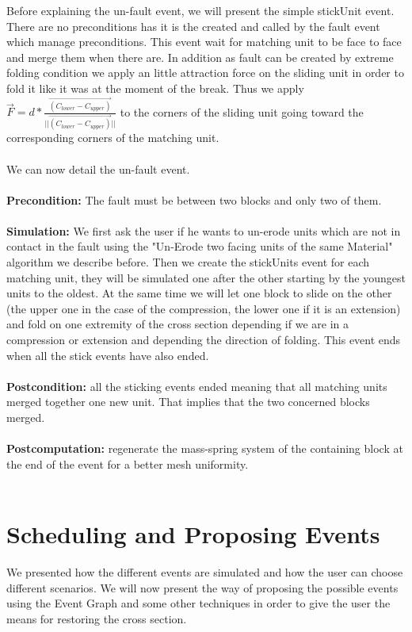 \documentclass[12pt, a4paper]{report} %
\begin{document}
Before explaining the un-fault event, we will present the simple stickUnit event. There are no preconditions has it is the created and called by the fault event which manage preconditions. This event wait for matching unit to be face to face and merge them when there are. In addition as fault can be created by extreme folding condition we apply an little attraction force on the sliding unit in order to fold it like it was at the moment of the break. Thus we apply $\overrightarrow{F} = d*\frac{\overrightarrow{(C_{lower} - C_{upper})} }{||\overrightarrow{(C_{lower} - C_{upper})}||}$ to the corners of the sliding unit going toward the corresponding corners of the matching unit.\\\\
We can now detail the un-fault event.\\\\
\textbf{Precondition:} The fault must be between two blocks and only two of them.\\\\
\textbf{Simulation:} We first ask the user if he wants to un-erode units which are not in contact in the fault using the "Un-Erode two facing units of the same Material" algorithm we describe before. Then we create the stickUnits event for each matching unit, they will be simulated one after the other starting by the youngest units to the oldest. At the same time we will let one block to slide on the other (the upper one in the case of the compression, the lower one if it is an extension) and fold on one extremity of the cross section depending if we are in a compression or extension and depending the direction of folding. This event ends when all the stick events have also ended.\\\\
\textbf{Postcondition:} all the sticking events ended meaning that all matching units merged together one new unit. That implies that the two concerned blocks merged.\\\\
\textbf{Postcomputation:} regenerate the mass-spring system of the containing block at the end of the event for a better mesh uniformity.\\\\ 
	
\chapter{Scheduling and Proposing Events}

We presented how the different events are simulated and how the user can choose different scenarios. We will now present the way of proposing the possible events using the Event Graph and some other techniques in order to give the user the means for restoring the cross section.\\\\
\end{document}
